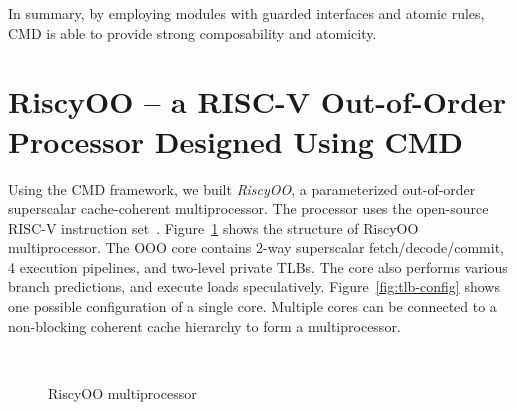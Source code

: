 \documentclass[conference]{IEEEtran}
\begin{document}
In summary, by employing modules with guarded interfaces and atomic rules, CMD is able to provide strong composability and atomicity.


\section{RiscyOO -- a RISC-V Out-of-Order Processor Designed Using CMD}\label{sec:ooo}
Using the CMD framework, we built \emph{RiscyOO}, a parameterized out-of-order superscalar cache-coherent multiprocessor.
The processor uses the open-source RISC-V instruction set~\cite{riscv}.
Figure~\ref{fig:ooo} shows the structure of RiscyOO multiprocessor.
The OOO core contains 2-way superscalar fetch/decode/commit, 4 execution pipelines, and two-level private TLBs.
The core also performs various branch predictions, and execute loads speculatively.
Figure~\ref{fig:tlb-config} shows one possible configuration of a single core.
Multiple cores can be connected to a non-blocking coherent cache hierarchy to form a multiprocessor.

\begin{figure}[!htb]
    \centering
    \\
    \caption{RiscyOO multiprocessor}\label{fig:ooo}
\end{figure}
\end{document}

